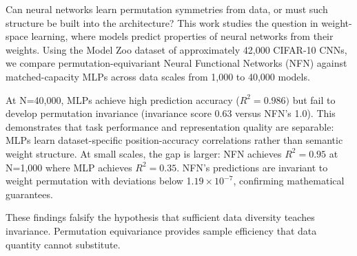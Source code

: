 
Can neural networks learn permutation symmetries from data, or must such structure be built into the architecture? This work studies the question in weight-space learning, where models predict properties of neural networks from their weights. Using the Model Zoo dataset of approximately 42,000 CIFAR-10 CNNs, we compare permutation-equivariant Neural Functional Networks (NFN) against matched-capacity MLPs across data scales from 1,000 to 40,000 models.

At N=40,000, MLPs achieve high prediction accuracy ($R^{2}=0.986)$ but fail to develop permutation invariance (invariance score 0.63 versus NFN's 1.0). This demonstrates that task performance and representation quality are separable: MLPs learn dataset-specific position-accuracy correlations rather than semantic weight structure. At small scales, the gap is larger: NFN achieves $R^{2}=0.95$ at N=1,000 where MLP achieves $R^{2}=0.35$. NFN's predictions are invariant to weight permutation with deviations below 1.$19\times 10^{-7}$, confirming mathematical guarantees.

These findings falsify the hypothesis that sufficient data diversity teaches invariance. Permutation equivariance provides sample efficiency that data quantity cannot substitute.

